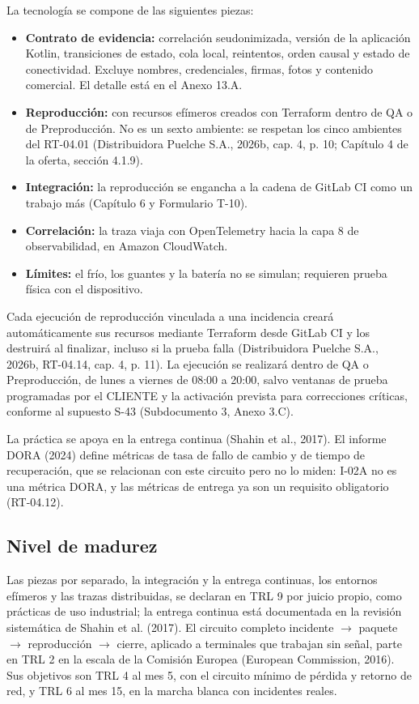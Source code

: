 La tecnología se compone de las siguientes piezas:

\begin{itemize}
  \item \textbf{Contrato de evidencia:} correlación seudonimizada, versión de la aplicación Kotlin, transiciones de estado, cola local, reintentos, orden causal y estado de conectividad. Excluye nombres, credenciales, firmas, fotos y contenido comercial. El detalle está en el Anexo 13.A.
  \item \textbf{Reproducción:} con recursos efímeros creados con Terraform dentro de QA o de Preproducción. No es un sexto ambiente: se respetan los cinco ambientes del RT-04.01 (Distribuidora Puelche S.A., 2026b, cap. 4, p. 10; Capítulo 4 de la oferta, sección 4.1.9).
  \item \textbf{Integración:} la reproducción se engancha a la cadena de GitLab CI como un trabajo más (Capítulo 6 y Formulario T-10).
  \item \textbf{Correlación:} la traza viaja con OpenTelemetry hacia la capa 8 de observabilidad, en Amazon CloudWatch.
  \item \textbf{Límites:} el frío, los guantes y la batería no se simulan; requieren prueba física con el dispositivo.
\end{itemize}

Cada ejecución de reproducción vinculada a una incidencia creará automáticamente sus recursos mediante Terraform desde GitLab CI y los destruirá al finalizar, incluso si la prueba falla (Distribuidora Puelche S.A., 2026b, RT-04.14, cap. 4, p. 11). La ejecución se realizará dentro de QA o Preproducción, de lunes a viernes de 08:00 a 20:00, salvo ventanas de prueba programadas por el CLIENTE y la activación prevista para correcciones críticas, conforme al supuesto S-43 (Subdocumento 3, Anexo 3.C).

La práctica se apoya en la entrega continua (Shahin et al., 2017). El informe DORA (2024) define métricas de tasa de fallo de cambio y de tiempo de recuperación, que se relacionan con este circuito pero no lo miden: I-02A no es una métrica DORA, y las métricas de entrega ya son un requisito obligatorio (RT-04.12).

\subsection{Nivel de madurez}

Las piezas por separado, la integración y la entrega continuas, los entornos efímeros y las trazas distribuidas, se declaran en TRL 9 por juicio propio, como prácticas de uso industrial; la entrega continua está documentada en la revisión sistemática de Shahin et al. (2017). El circuito completo incidente \ensuremath{\rightarrow} paquete \ensuremath{\rightarrow} reproducción \ensuremath{\rightarrow} cierre, aplicado a terminales que trabajan sin señal, parte en TRL 2 en la escala de la Comisión Europea (European Commission, 2016). Sus objetivos son TRL 4 al mes 5, con el circuito mínimo de pérdida y retorno de red, y TRL 6 al mes 15, en la marcha blanca con incidentes reales.


